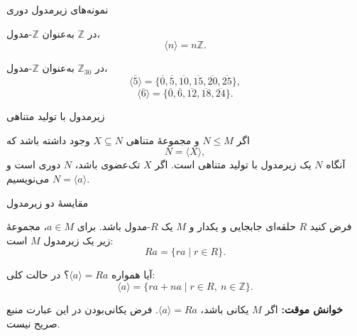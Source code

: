 \begin{frame}{نمونه‌های زیرمدول دوری}
    \label{lec04:cyclic-examples}
    \begin{example}
        در $\mathbb Z$ به‌عنوان $\mathbb Z$-مدول،
        \[
            \langle n\rangle=n\mathbb Z.
        \]
    \end{example}
    \begin{example}
        در $\mathbb Z_{30}$ به‌عنوان $\mathbb Z$-مدول،
        \[
            \langle\overline5\rangle=
            \{\overline0,\overline5,\overline{10},\overline{15},\overline{20},\overline{25}\},
        \]
        \[
            \langle\overline6\rangle=
            \{\overline0,\overline6,\overline{12},\overline{18},\overline{24}\}.
        \]
    \end{example}
\end{frame}

\begin{frame}{زیرمدول با تولید متناهی}
    \label{lec04:finite-generation}
    \begin{remark}
        اگر $N\leq M$ و مجموعهٔ متناهی $X\subseteq N$ وجود داشته باشد که
        \[
            N=\langle X\rangle,
        \]
        آنگاه $N$ یک زیرمدول با تولید متناهی است.
        اگر $X$ تک‌عضوی باشد، $N$ دوری است و می‌نویسیم $N=\langle a\rangle$.
    \end{remark}
\end{frame}

\begin{frame}{مقایسهٔ دو زیرمدول}
    \label{lec04:ra-versus-generated}
    \begin{definition}
        فرض کنید $R$ حلقه‌ای جابجایی و یکدار و $M$ یک $R$-مدول باشد.
        برای $a\in M$، مجموعهٔ زیر یک زیرمدول $M$ است:
        \[
            Ra=\{ra\mid r\in R\}.
        \]
    \end{definition}
    \begin{remark}
        آیا همواره $\langle a\rangle=Ra$؟ در حالت کلی:
        \[
            \langle a\rangle=\{ra+na\mid r\in R,\ n\in\mathbb Z\}.
        \]
    \end{remark}
    \textbf{خوانش موقت:} اگر $M$ یکانی باشد، $\langle a\rangle=Ra$.
    فرض یکانی‌بودن در این عبارت منبع صریح نیست. \lr{[L04-Q01]}
\end{frame}

